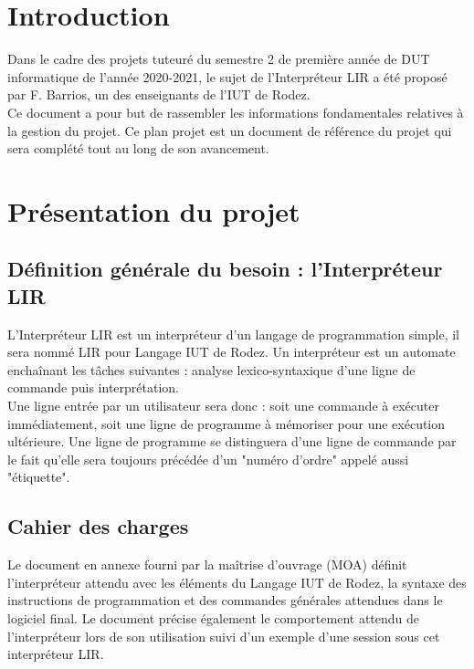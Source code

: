 \documentclass[11pt,a4paper,titlepage,openright]{report}
\begin{document}
    \renewcommand{\contentsname}{Sommaire}
    \tableofcontents

    \chapter*{Introduction}
    \Large
    Dans le cadre des projets tuteuré du semestre 2 de première année de
    DUT informatique de l’année 2020-2021, le sujet de l’Interpréteur LIR
    a été proposé par F. Barrios, un des enseignants de l’IUT de Rodez.
    \\Ce document a pour but de rassembler les informations fondamentales
    relatives à la gestion du projet. Ce plan projet est un document de
    référence du projet qui sera complété tout au long de son avancement.

    \normalsize
    \chapter{Présentation du projet}
    \section{Définition générale du besoin : l'Interpréteur LIR}
    L’Interpréteur LIR est un interpréteur d’un langage de programmation
    simple, il sera nommé LIR pour Langage IUT de Rodez.
    Un interpréteur est un automate enchaînant les tâches suivantes :
    analyse lexico-syntaxique d’une ligne de commande puis interprétation.
    \\Une ligne entrée par un utilisateur sera donc : soit une commande à
    exécuter immédiatement, soit une ligne de programme à mémoriser pour
    une exécution ultérieure. Une ligne de programme se distinguera d'une
    ligne de commande par le fait qu'elle sera toujours précédée d'un
    "numéro d'ordre" appelé aussi "étiquette".

    \section{Cahier des charges}
    Le document en annexe fourni par la maîtrise d’ouvrage (MOA) définit
    l’interpréteur attendu avec les éléments du Langage IUT de Rodez, la
    syntaxe des instructions de programmation et des commandes générales
    attendues dans le logiciel final. Le document précise également le
    comportement attendu de l’interpréteur lors de son utilisation suivi
    d’un exemple d’une session sous cet interpréteur LIR.
\end{document}
